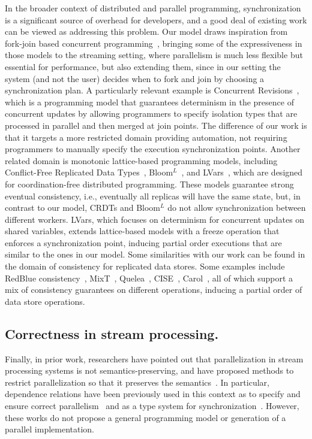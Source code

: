 In the broader context of distributed and parallel programming,
synchronization is a significant source of overhead for developers,
and a good deal of existing work can be viewed as addressing this problem.
Our model draws inspiration from fork-join based
concurrent programming~\cite{frigo1998implementation,lea2000java},
  bringing some of the expressiveness in those models to the streaming setting,
  where parallelism is much less flexible but essential for performance,
  but also extending them, since in our setting the system (and not the user) decides when to fork and join by choosing a synchronization plan.
%
A particularly relevant example is
Concurrent Revisions~\cite{burckhardt2010concurrent},
which is a programming model that guarantees determinism in the presence of concurrent updates by allowing programmers to specify isolation types that are processed in parallel and then merged at join points.
The difference of our work is that it targets a more restricted domain providing automation,
not requiring programmers to manually specify the execution synchronization points.
Another related domain is monotonic lattice-based programming models,
including
Conflict-Free Replicated Data Types~\cite{shapiro2011conflict},
Bloom$^L$~\cite{conway12},
and LVars~\cite{lvars13,lvars14},
which are designed for coordination-free distributed programming.
These models guarantee strong eventual consistency,
i.e., eventually all replicas will have the same state,
but, in contrast to our model, CRDTs and Bloom$^L$
do not allow synchronization between different workers.
LVars, which focuses on determinism for concurrent updates on shared variables,
extends lattice-based models with a freeze operation that enforces a synchronization point,
inducing partial order executions that are similar to the ones in our model.
Some similarities with our work can be found in the domain of consistency for replicated data stores.
Some examples include RedBlue consistency~\cite{li2012making},
MixT~\cite{milano2018mixt},
Quelea~\cite{sivaramakrishnan2015declarative},
CISE~\cite{gotsman16},
Carol~\cite{lewchenko2019sequential},
all of which support a mix of consistency guarantees on different operations,
inducing a partial order of data store operations.

\subsection{Correctness in stream processing.}

Finally, in prior work,
researchers have pointed out that
parallelization in stream processing systems is not
semantics-preserving, and have proposed methods to restrict
parallelization so that it preserves the
semantics~\cite{schneider2015safeparallelism, mamouras2019data}.
In particular, dependence relations have been previously used in this context
as to specify and ensure correct parallelism~\cite{mamouras2019data,2020:DifferentialTesting:OOPSLA}
and as a type system for synchronization~\cite{alur2021synchronization}.
However, these works do not propose a general programming model
or generation of a parallel implementation.


